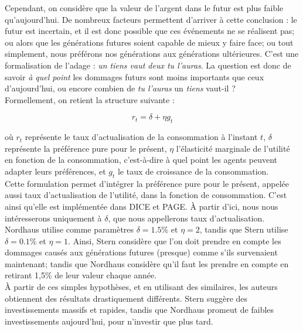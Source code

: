 Cependant, on considère que la valeur de l'argent dans le futur est plus faible qu'aujourd'hui. De nombreux facteurs permettent d'arriver à cette conclusion : le futur est incertain, et il est donc possible que ces événements ne se réalisent pas; ou alors que les générations futures soient capable de mieux y faire face; ou tout simplement, nous préférons nos générations aux générations ultérieures. C'est une formalisation de l'adage : \emph{un tiens vaut deux tu l'auras}. La question est donc de savoir \emph{à quel point} les dommages futurs sont moins importants que ceux d'aujourd'hui, ou encore combien de \emph{tu l'auras} un \emph{tiens} vaut-il ? \\

Formellement, on retient la structure suivante : 

\begin{equation}
    r_t = \delta + \eta g_t 
    \label{eq:disc_rate}
\end{equation}

où $r_t$ représente le taux d'actualisation de la consommation à l'instant $t$, $\delta$ représente la préférence pure pour le présent, $\eta$ l'élasticité marginale de l'utilité en fonction de la consommation, c'est-à-dire à quel point les agents peuvent adapter leurs préférences,  et $g_t$ le taux de croissance de la consommation. \\

Cette formulation permet d'intégrer la préférence pure pour le présent, appelée aussi taux d'actualisation de l'utilité, dans la fonction de consommation. C'est ainsi qu'elle est implémentée dans DICE et PAGE. À partir d'ici, nous nous intéresserons uniquement à $\delta$, que nous appellerons taux d'actualisation. \\

Nordhaus utilise comme paramètres $\delta = 1.5\%$ et $\eta=2$, tandis que Stern utilise $\delta=0.1\%$ et $\eta=1$. Ainsi, Stern considère que l'on doit prendre en compte les dommages causés aux générations futures (presque) comme s'ils survenaient maintenant; tandis que Nordhaus considère qu'il faut les prendre en compte en retirant 1,5\% de leur valeur chaque année. \\

À partir de ces simples hypothèses, et en utilisant des similaires, les auteurs obtiennent des résultats drastiquement différents. Stern suggère des investissements massifs et rapides, tandis que Nordhaus promeut de faibles investissements aujourd'hui, pour n'investir que plus tard. 

